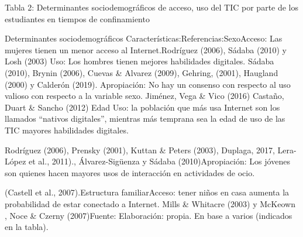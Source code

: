 Tabla 2: Determinantes sociodemográficos de acceso, uso del TIC por
parte de los estudiantes en tiempos de confinamiento

Determinantes sociodemográficos Características:Referencias:SexoAcceso:
Las mujeres tienen un menor acceso al Internet.Rodríguez (2006), Sádaba
(2010) y Losh (2003) Uso: Los hombres tienen mejores habilidades
digitales. Sádaba (2010), Brynin (2006), Cuevas \& Alvarez (2009),
Gehring, (2001), Haugland (2000) y Calderón (2019). Apropiación: No hay
un consenso con respecto al uso valioso con respecto a la variable sexo.
Jiménez, Vega \& Vico (2016) Castaño, Duart \& Sancho (2012) Edad Uso:
la población que más usa Internet son los llamados ``nativos
digitales'', mientras más temprana sea la edad de uso de las TIC mayores
habilidades digitales.

Rodríguez (2006), Prensky (2001), Kuttan \& Peters (2003), Duplaga,
2017, Lera-López et al., 2011)., Álvarez-Sigüenza y Sádaba
(2010)Apropiación: Los jóvenes son quienes hacen mayores usos de
interacción en actividades de ocio.

(Castell et al., 2007).Estructura familiarAcceso: tener niños en casa
aumenta la probabilidad de estar conectado a Internet. Mills \& Whitacre
(2003) y McKeown , Noce \& Czerny (2007)Fuente: Elaboración: propia. En
base a varios (indicados en la tabla).

